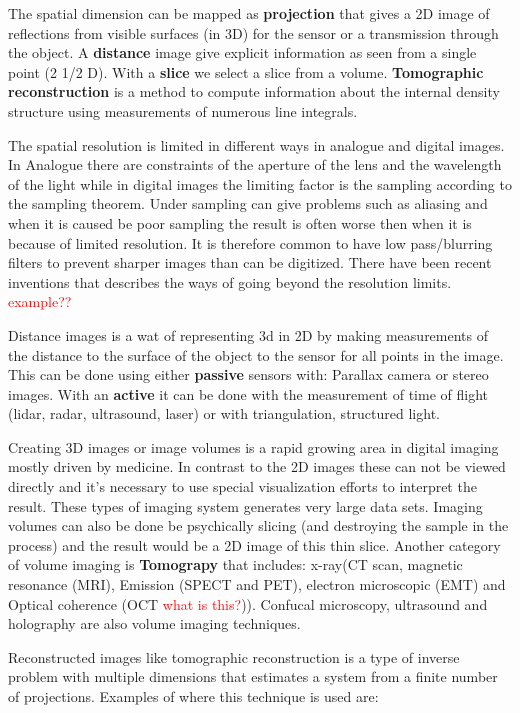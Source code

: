 The spatial dimension can be mapped as \textbf{projection} that gives a 2D image of reflections from visible surfaces (in 3D) for the sensor or a transmission through the object. A \textbf{distance} image give explicit information as seen from a single point (2 1/2 D). With a \textbf{slice} we select a slice from a volume. \textbf{Tomographic reconstruction} is a method to compute information about the internal density structure using measurements of numerous line integrals. 

The spatial resolution is limited in different ways in analogue and digital images. In Analogue there are constraints of the aperture of the lens and the wavelength of the light while in digital images the limiting factor is the sampling according to the sampling theorem. Under sampling can give problems such as aliasing and when it is caused be poor sampling the result is often worse then when it is because of limited resolution. It is therefore common to have low pass/blurring filters to prevent sharper images than can be digitized. There have been recent inventions that describes the ways of going beyond the resolution limits. \textcolor{red}{example??} 


Distance images is a wat of representing 3d in 2D by making measurements of the distance to the surface of the object to the sensor for all points in the image. This can be done using either \textbf{passive} sensors with: Parallax camera or stereo images. With an \textbf{active} it can be done with the measurement of time of flight (lidar, radar, ultrasound, laser) or with triangulation, structured light. 

Creating 3D images or image volumes is a rapid growing area in digital imaging mostly driven by medicine. In contrast to the 2D images these can not be viewed directly and it's necessary to use special visualization efforts to interpret the result. These types of imaging system generates very large data sets. Imaging volumes can also be done be psychically slicing (and destroying the sample in the process) and the result would be a 2D image of this thin slice. Another category of volume imaging is \textbf{Tomograpy} that includes: x-ray(CT scan, magnetic resonance (MRI), Emission (SPECT and PET), electron microscopic (EMT) and Optical coherence (OCT \textcolor{red}{what is this?})). Confucal microscopy, ultrasound and holography are also volume imaging techniques.

Reconstructed images like tomographic reconstruction is a type of inverse problem with multiple dimensions that estimates a system from a finite number of projections. Examples of where this technique is used are:

